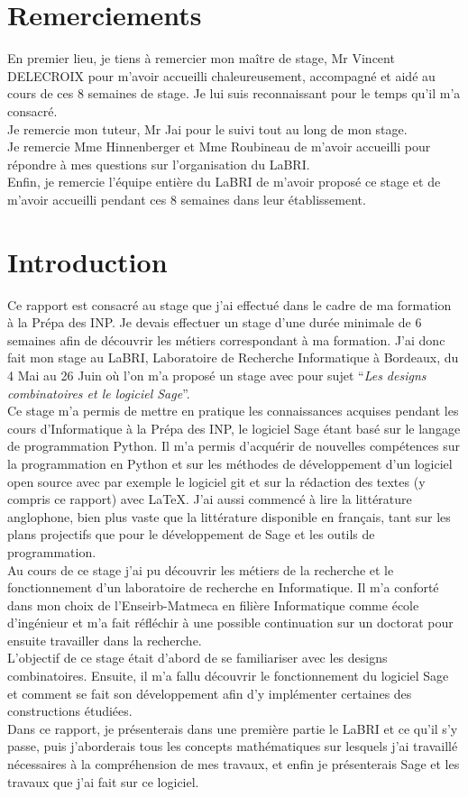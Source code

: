 \documentclass[a4paper]{article}
\begin{document}
\section*{Remerciements}
En premier lieu, je tiens à remercier mon maître de stage, Mr Vincent DELECROIX pour m'avoir accueilli chaleureusement, accompagné et aidé au cours de ces 8 semaines de stage. Je lui suis reconnaissant pour le temps qu'il m'a consacré.\\
Je remercie mon tuteur, Mr Jai pour le suivi tout au long de mon stage.\\
Je remercie Mme Hinnenberger et Mme Roubineau de m'avoir accueilli pour répondre à mes questions sur l'organisation du LaBRI.\\
Enfin, je remercie l'équipe entière du LaBRI de m'avoir proposé ce stage et de m'avoir accueilli pendant ces 8 semaines dans leur établissement.
\newpage
\section*{Introduction}
Ce rapport est consacré au stage que j'ai effectué dans le cadre de ma formation à la Prépa des INP. Je devais effectuer un stage d'une durée minimale de 6 semaines afin de découvrir les métiers correspondant à ma formation.
J'ai donc fait mon stage au LaBRI, Laboratoire de Recherche Informatique à Bordeaux, du 4 Mai au 26 Juin où l'on m'a proposé un stage avec pour sujet ``\textit{Les designs combinatoires et le logiciel Sage}''.\\
Ce stage m'a permis de mettre en pratique les connaissances acquises pendant les cours d'Informatique à la Prépa des INP, le logiciel Sage étant basé sur le langage de programmation Python. Il m'a permis d'acquérir de nouvelles compétences sur la programmation en Python et sur les méthodes de développement d'un logiciel open source avec par exemple le logiciel git et sur la rédaction des textes (y compris ce rapport) avec \LaTeX. J'ai aussi commencé à lire la littérature anglophone, bien plus vaste que la littérature disponible en français, tant sur les plans projectifs que pour le développement de Sage et les outils de programmation. \\
Au cours de ce stage j'ai pu découvrir les métiers de la recherche et le fonctionnement d'un laboratoire de recherche en Informatique. Il m'a conforté dans mon choix de l'Enseirb-Matmeca en filière Informatique comme école d'ingénieur et m'a fait réfléchir à une possible continuation sur un doctorat pour ensuite travailler dans la recherche.\\
L'objectif de ce stage était d'abord de se familiariser avec les designs combinatoires. Ensuite, il m'a fallu découvrir le fonctionnement du logiciel Sage et comment se fait son développement afin d'y implémenter certaines des constructions étudiées.\bigskip \\
Dans ce rapport, je présenterais dans une première partie le LaBRI et ce qu'il s'y passe, puis j'aborderais tous les concepts mathématiques sur lesquels j'ai travaillé nécessaires à la compréhension de mes travaux, et enfin je présenterais Sage et les travaux que j'ai fait sur ce logiciel. 
\newpage
\end{document}
